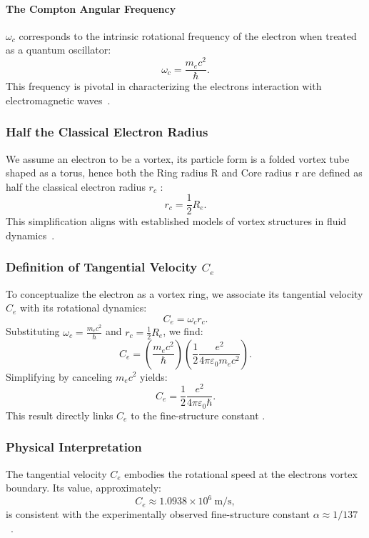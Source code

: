 \paragraph*{The Compton Angular Frequency}
 $\omega_c$ corresponds to the intrinsic rotational frequency of the electron when treated as a quantum oscillator:
\begin{equation*}
    \omega_c = \frac{m_e c^2}{\hbar}.
\end{equation*}
This frequency is pivotal in characterizing the electron\rqs s interaction with electromagnetic waves~\cite{kelvin1867}.

\subsubsection*{Half the Classical Electron Radius}
We assume an electron to be a vortex, its particle form is a folded vortex tube shaped as a torus, hence both the Ring radius R and Core radius r are defined as half the classical electron radius  $r_c$ :
\begin{equation*}
    r_c = \frac{1}{2} R_e.
\end{equation*}
This simplification aligns with established models of vortex structures in fluid dynamics~\cite{kleckner2013}.

\subsubsection*{Definition of Tangential Velocity $C_e$}
To conceptualize the electron as a vortex ring, we associate its tangential velocity $C_e$ with its rotational dynamics:
\begin{equation*}
    C_e = \omega_c r_c.
\end{equation*}
Substituting $\omega_c = \frac{m_e c^2}{\hbar}$ and $r_c = \frac{1}{2} R_e$, we find:
\begin{equation*}
    C_e = \left( \frac{m_e c^2}{\hbar} \right) \left( \frac{1}{2} \frac{e^2}{4\pi \varepsilon_0 m_e c^2} \right).
\end{equation*}
Simplifying by canceling $m_e c^2$ yields:
\begin{equation*}
    C_e = \frac{1}{2} \frac{e^2}{4\pi \varepsilon_0 \hbar}.\label{eq:C_e-from-compton}
\end{equation*}
This result directly links $C_e$ to the fine-structure constant \cite{vinen2024}.

\subsubsection*{Physical Interpretation}
The tangential velocity $C_e$ embodies the rotational speed at the electron\rqs s vortex boundary. Its value, approximately:
\begin{equation*}
    C_e \approx 1.0938 \times 10^6 \ \text{m/s},
\end{equation*}
is consistent with the experimentally observed fine-structure constant $\alpha \approx 1/137$~\cite{ricca1998}.

